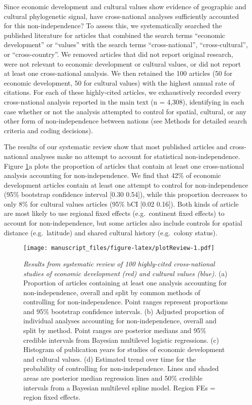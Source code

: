 \documentclass[english,man,floatsintext]{apa6}
\begin{document}
Since economic development and cultural values show evidence of geographic and cultural phylogenetic signal, have cross-national analyses sufficiently accounted for this non-independence? To assess this, we systematically searched the published literature for articles that combined the search terms \enquote{economic development} or \enquote{values} with the search terms \enquote{cross-national}, \enquote{cross-cultural}, or \enquote{cross-country}. We removed articles that did not report original research, were not relevant to economic development or cultural values, or did not report at least one cross-national analysis. We then retained the 100 articles (50 for economic development, 50 for cultural values) with the highest annual rate of citations. For each of these highly-cited articles, we exhaustively recorded every cross-national analysis reported in the main text (n = 4,308), identifying in each case whether or not the analysis attempted to control for spatial, cultural, or any other form of non-independence between nations (see Methods for detailed search criteria and coding decisions).

The results of our systematic review show that most published articles and cross-national analyses make no attempt to account for statistical non-independence. Figure \ref{fig:plotReview}a plots the proportion of articles that contain at least one cross-national analysis accounting for non-independence. We find that 42\% of economic development articles contain at least one attempt to control for non-independence (95\% bootstrap confidence interval {[}0.30 0.54{]}), while this proportion decreases to only 8\% for cultural values articles (95\% bCI {[}0.02 0.16{]}). Both kinds of article are most likely to use regional fixed effects (e.g.~continent fixed effects) to account for non-independence, but some articles also include controls for spatial distance (e.g.~latitude) and shared cultural history (e.g.~colony status).



\begin{figure}
\centering
\texttt{[image: manuscript\_files/figure-latex/plotReview-1.pdf]}
\caption{\label{fig:plotReview}\emph{Results from systematic review of 100 highly-cited cross-national studies of economic development (red) and cultural values (blue).} (a) Proportion of articles containing at least one analysis accounting for non-independence, overall and split by common methods of controlling for non-independence. Point ranges represent proportions and 95\% bootstrap confidence intervals. (b) Adjusted proportion of individual analyses accounting for non-independence, overall and split by method. Point ranges are posterior medians and 95\% credible intervals from Bayesian multilevel logistic regressions. (c) Histogram of publication years for studies of economic development and cultural values. (d) Estimated trend over time for the probability of controlling for non-independence. Lines and shaded areas are posterior median regression lines and 50\% credible intervals from a Bayesian multilevel spline model. Region FEs = region fixed effects.}
\end{figure}
\end{document}

